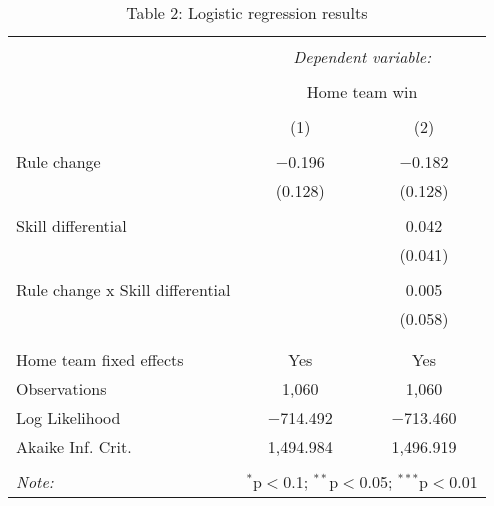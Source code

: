 
\begin{table}[!htbp] \centering 
  \caption{Table 2: Logistic regression results} 
  \label{} 
\begin{tabular}{@{\extracolsep{5pt}}lcc} 
\\[-1.8ex]\hline 
\hline \\[-1.8ex] 
 & \multicolumn{2}{c}{\textit{Dependent variable:}} \\ 
\cline{2-3} 
\\[-1.8ex] & \multicolumn{2}{c}{Home team win} \\ 
\\[-1.8ex] & (1) & (2)\\ 
\hline \\[-1.8ex] 
 Rule change & $-$0.196 & $-$0.182 \\ 
  & (0.128) & (0.128) \\ 
  & & \\ 
 Skill differential &  & 0.042 \\ 
  &  & (0.041) \\ 
  & & \\ 
 
                               Rule change x Skill differential &  & 0.005 \\ 
  &  & (0.058) \\ 
  & & \\ 
\hline \\[-1.8ex] 
Home team fixed effects & Yes & Yes \\ 
Observations & 1,060 & 1,060 \\ 
Log Likelihood & $-$714.492 & $-$713.460 \\ 
Akaike Inf. Crit. & 1,494.984 & 1,496.919 \\ 
\hline 
\hline \\[-1.8ex] 
\textit{Note:}  & \multicolumn{2}{r}{$^{*}$p$<$0.1; $^{**}$p$<$0.05; $^{***}$p$<$0.01} \\ 
\end{tabular} 
\end{table} 
